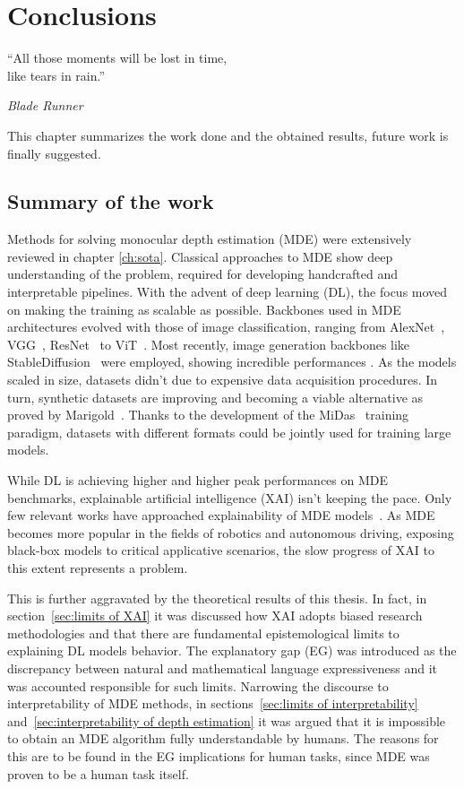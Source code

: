 \chapter{Conclusions}
\label{ch:conc}
\epigraph{\enquote{All those moments will be lost in time, \\
like tears in rain.}}{\emph{Blade Runner}}

This chapter summarizes the work done and the obtained results, future work is finally suggested.

\section{Summary of the work}
Methods for solving monocular depth estimation (MDE) were extensively reviewed in chapter \ref{ch:sota}.
Classical approaches to MDE show deep understanding of the problem, required for developing handcrafted and interpretable pipelines.
With the advent of deep learning (DL), the focus moved on making the training as scalable as possible.
Backbones used in MDE architectures evolved with those of image classification, ranging from AlexNet~\cite{AlexNet}, VGG~\cite{VGG}, ResNet~\cite{ResNet} to ViT~\cite{ViT}.
Most recently, image generation backbones like StableDiffusion~\cite{StableDiffusionV2} were employed, showing incredible performances \cite{Marigold}.
As the models scaled in size, datasets didn't due to expensive data acquisition procedures.
In turn, synthetic datasets \cite{VirtualKITTI2, Hypersim} are improving and becoming a viable alternative as proved by Marigold~\cite{Marigold}.
Thanks to the development of the MiDas~\cite{MiDas} training paradigm, datasets with different formats could be jointly used for training large models.

While DL is achieving higher and higher peak performances on MDE benchmarks, explainable artificial intelligence (XAI) isn't keeping the pace.
Only few relevant works have approached explainability of MDE models~\cite{Hu, Dijk, towards_interpretable}.
As MDE becomes more popular in the fields of robotics and autonomous driving, exposing black-box models to critical applicative scenarios, the slow progress of XAI to this extent represents a problem.

This is further aggravated by the theoretical results of this thesis.
In fact, in section~\ref{sec:limits of XAI} it was discussed how XAI adopts biased research methodologies and that there are fundamental epistemological limits to explaining DL models behavior.
The explanatory gap (EG) was introduced as the discrepancy between natural and mathematical language expressiveness and it was accounted responsible for such limits.
Narrowing the discourse to interpretability of MDE methods, in sections~\ref{sec:limits of interpretability} and~\ref{sec:interpretability of depth estimation} it was argued that it is impossible to obtain an MDE algorithm fully understandable by humans.
The reasons for this are to be found in the EG implications for human tasks, since MDE was proven to be a human task itself.

